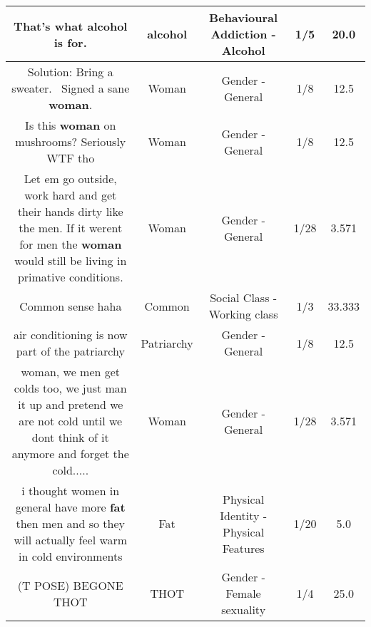 \documentclass[11pt]{article}
\newlength\mylength
\begin{document}
\begin{center}
\begin{longtable}{|C{.65\mylength}|C{.30\mylength}|C{.12\mylength}|C{.12\mylength}|C{.12\mylength}|}
  \small That's what \textbf{alcohol} is for.\normalsize   & alcohol & Behavioural Addiction - Alcohol & 1/5 & 20.0 \\  \hline
  \small Solution: Bring a sweater.  ~Signed a sane \textbf{woman}.\normalsize   & Woman & Gender - General & 1/8 & 12.5 \\  \hline
  \small Is this \textbf{woman} on mushrooms? Seriously WTF tho\normalsize   & Woman & Gender - General & 1/8 & 12.5 \\  \hline
  \small Let em go outside, work hard and get their hands dirty like the men. If it werent for men the \textbf{woman} would still be living in primative conditions.\normalsize   & Woman & Gender - General & 1/28 & 3.571 \\  \hline
  \small Common sense haha\normalsize   & Common & Social Class - Working class & 1/3 & 33.333 \\  \hline
  \small air conditioning is now part of the patriarchy\normalsize   & Patriarchy & Gender - General & 1/8 & 12.5 \\  \hline
  \small woman, we men get colds too, we just man it up and pretend we are not cold until we dont think of it anymore and forget the cold.....\normalsize   & Woman & Gender - General & 1/28 & 3.571 \\  \hline
  \small i thought women in general have more \textbf{fat} then men and so they will actually feel warm in cold environments\normalsize   & Fat & Physical Identity - Physical Features & 1/20 & 5.0 \\  \hline
  \small (T POSE) BEGONE THOT\normalsize   & THOT & Gender - Female sexuality & 1/4 & 25.0 \\  \hline

\end{longtable}
\end{center}
\end{document}
